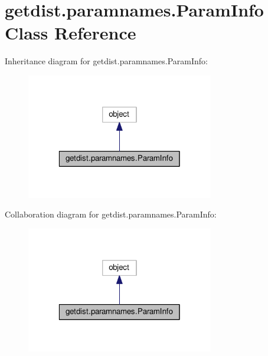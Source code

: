 \hypertarget{classgetdist_1_1paramnames_1_1ParamInfo}{}\section{getdist.\+paramnames.\+Param\+Info Class Reference}
\label{classgetdist_1_1paramnames_1_1ParamInfo}


Inheritance diagram for getdist.\+paramnames.\+Param\+Info\+:
\nopagebreak
\begin{figure}[H]
\begin{center}
\leavevmode
\includegraphics[width=232pt]{classgetdist_1_1paramnames_1_1ParamInfo__inherit__graph}
\end{center}
\end{figure}


Collaboration diagram for getdist.\+paramnames.\+Param\+Info\+:
\nopagebreak
\begin{figure}[H]
\begin{center}
\leavevmode
\includegraphics[width=232pt]{classgetdist_1_1paramnames_1_1ParamInfo__coll__graph}
\end{center}
\end{figure}
